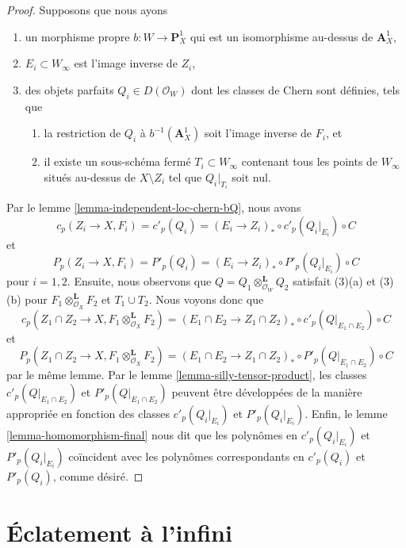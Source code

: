 \begin{proof}
\medskip\noindent
Supposons que nous ayons
\begin{enumerate}
\item un morphisme propre $b : W \to \mathbf{P}^1_X$ qui est un isomorphisme
au-dessus de $\mathbf{A}^1_X$,
\item $E_i \subset W_\infty$ est l'image inverse de $Z_i$,
\item des objets parfaits $Q_i \in D(\mathcal{O}_W)$ dont les classes de Chern
sont définies, tels que
\begin{enumerate}
\item la restriction de $Q_i$ à $b^{-1}(\mathbf{A}^1_X)$ soit
l'image inverse de $F_i$, et
\item il existe un sous-schéma fermé $T_i \subset W_\infty$ contenant
tous les points de $W_\infty$ situés au-dessus de $X \setminus Z_i$ tel que
$Q_i|_{T_i}$ soit nul.
\end{enumerate}
\end{enumerate}
Par le lemme \ref{lemma-independent-loc-chern-bQ}, nous avons
$$
c_p(Z_i \to X, F_i) = c'_p(Q_i) =
(E_i \to Z_i)_* \circ c'_p(Q_i|_{E_i}) \circ C
$$
et
$$
P_p(Z_i \to X, F_i) = P'_p(Q_i) =
(E_i \to Z_i)_* \circ P'_p(Q_i|_{E_i}) \circ C
$$
pour $i = 1, 2$. Ensuite, nous observons que
$Q = Q_1 \otimes_{\mathcal{O}_W}^\mathbf{L} Q_2$
satisfait (3)(a) et (3)(b) pour $F_1 \otimes_{\mathcal{O}_X}^\mathbf{L} F_2$
et $T_1 \cup T_2$. Nous voyons donc que
$$
c_p(Z_1 \cap Z_2 \to X, F_1 \otimes_{\mathcal{O}_X}^\mathbf{L} F_2) =
(E_1 \cap E_2 \to Z_1 \cap Z_2)_* \circ
c'_p(Q|_{E_1 \cap E_2}) \circ C
$$
et
$$
P_p(Z_1 \cap Z_2 \to X, F_1 \otimes_{\mathcal{O}_X}^\mathbf{L} F_2) =
(E_1 \cap E_2 \to Z_1 \cap Z_2)_* \circ
P'_p(Q|_{E_1 \cap E_2}) \circ C
$$
par le même lemme. Par le lemme \ref{lemma-silly-tensor-product},
les classes $c'_p(Q|_{E_1 \cap E_2})$ et $P'_p(Q|_{E_1 \cap E_2})$
peuvent être développées de la manière appropriée en fonction des classes
$c'_p(Q_i|_{E_i})$ et $P'_p(Q_i|_{E_i})$. Enfin, le
lemme \ref{lemma-homomorphism-final}
nous dit que les polynômes en $c'_p(Q_i|_{E_i})$ et $P'_p(Q_i|_{E_i})$
coïncident avec les polynômes correspondants en
$c'_p(Q_i)$ et $P'_p(Q_i)$, comme désiré.
\end{proof}






\section{Éclatement à l'infini}
\label{section-blowup-Z-first}

